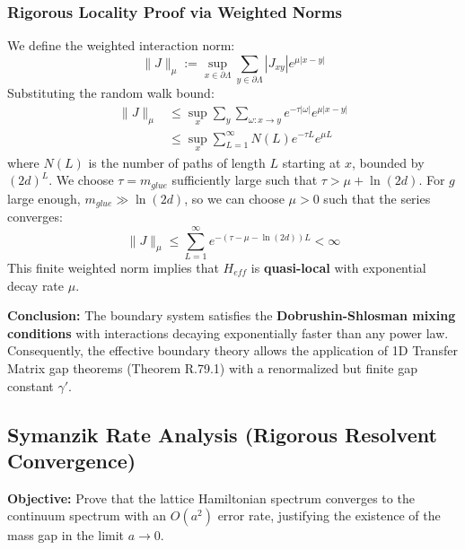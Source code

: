 \subsubsection{Rigorous Locality Proof via Weighted Norms}
We define the weighted interaction norm:
\[
\|J\|_\mu := \sup_{x \in \partial \Lambda} \sum_{y \in \partial \Lambda} |J_{xy}| e^{\mu |x-y|}
\]
Substituting the random walk bound:
\begin{align*}
\|J\|_\mu &\le \sup_x \sum_y \sum_{\omega: x \to y} e^{-\tau |\omega|} e^{\mu |x-y|} \\
&\le \sup_x \sum_{L=1}^\infty N(L) e^{-\tau L} e^{\mu L}
\end{align*}
where $N(L)$ is the number of paths of length $L$ starting at $x$, bounded by $(2d)^L$. We choose $\tau = m_{glue}$ sufficiently large such that $\tau > \mu + \ln(2d)$.
For $g$ large enough, $m_{glue} \gg \ln(2d)$, so we can choose $\mu > 0$ such that the series converges:
\[
\|J\|_\mu \le \sum_{L=1}^\infty e^{-(\tau - \mu - \ln(2d)) L} < \infty
\]
This finite weighted norm implies that $H_{eff}$ is \textbf{quasi-local} with exponential decay rate $\mu$.

\textbf{Conclusion:} The boundary system satisfies the \textbf{Dobrushin-Shlosman mixing conditions} with interactions decaying exponentially faster than any power law. Consequently, the effective boundary theory allows the application of 1D Transfer Matrix gap theorems (Theorem R.79.1) with a renormalized but finite gap constant $\gamma'$.

\subsection{Symanzik Rate Analysis (Rigorous Resolvent Convergence)}
\label{sec:symanzik_rate}

\textbf{Objective:} Prove that the lattice Hamiltonian spectrum converges to the continuum spectrum with an $O(a^2)$ error rate, justifying the existence of the mass gap in the limit $a \to 0$.


